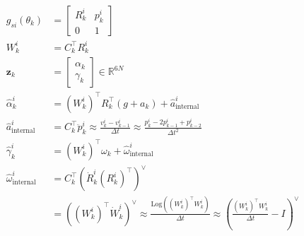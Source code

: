 \documentclass[11pt]{article}
\begin{document}
\begin{align*}
    g_{si}(\theta_k) &= \begin{bmatrix}
        R_k^i & p_k^i \\
        0 & 1
    \end{bmatrix} \\
    W_k^i &= C_k^\top R_k^i \\
    \mathbf{z}_k &= \begin{bmatrix}
        \alpha_k \\ \gamma_k
    \end{bmatrix} \in \mathbb{R}^{6N} \\
    \hat{\alpha}_k^i &= (W_k^i)^\top R_k^\top (g + a_k) + \hat{a}^i_{\text{internal}} \\
    \hat{a}^i_{\text{internal}} &= C_k^\top \ddot{p}_k^i \approx \frac{v_k^i - v_{k-1}^i}{\Delta t} \approx \frac{p_k^i - 2p_{k-1}^i + p_{k-2}^i}{\Delta t^2} \\
    \hat{\gamma}_k^i &= (W_k^i)^\top \omega_k + \hat{\omega}^i_{\text{internal}} \\
    \hat{\omega}^i_{\text{internal}} &= C_k^\top\left(\dot{R}_k^i(R_k^i)^\top\right)^\vee \\
    &= \left((W_k^i)^\top \dot{W}_k^i\right)^\vee \approx \frac{\text{Log}\left((W_k^i)^\top W_k^i\right)}{\Delta t} \approx \left(\frac{(W_k^i)^\top W_k^i}{\Delta t} - I\right)^\vee
\end{align*}
\end{document}

